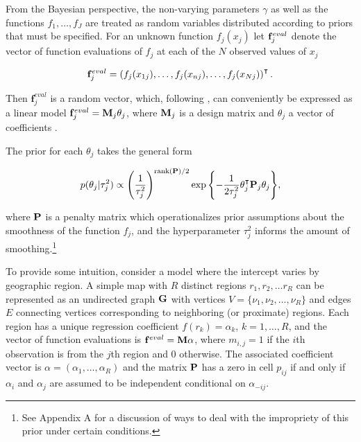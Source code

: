 From the Bayesian perspective, the non-varying parameters $\gamma$ as well as the 
functions $f_1, \dots, f_J$ are treated as random variables distributed according to priors that must 
be specified. For an unknown function $f_j(x_j)$ let $\mathbf{f}_j^{eval}$ denote the vector of function 
evaluations of $f_j$ at each of the $N$ observed values of $x_j$ 

\begin{equation*}
\mathbf{f}_j^{eval} = \left(f_j(x_{1j}), \dots, f_j(x_{nj}), \dots, f_j(x_{Nj})\right)^\intercal.  
 \end{equation*}
 
\noindent Then $\mathbf{f}_j^{eval}$ is a random vector, which, following 
, can conveniently be expressed as a linear model 
$\mathbf{f}_j^{eval} = \mathbf{M}_j \theta_j$, where $\mathbf{M}_j$ is a design matrix and 
$\theta_j$ a vector of coefficients . 

The prior for each $\theta_j$  takes the general form

\begin{equation*}
p(\theta_j | \tau^2_j) 
\propto 
\left(\frac{1}{\tau_j^2} \right)^{{\rm rank}(\mathbf{P})/2}
\exp{\left\{-\frac{1}{2\tau^2_j} \theta_j^\intercal \mathbf{P}_j \theta_j\right\}},
\end{equation*}

\noindent where $\mathbf{P}$ is a penalty matrix which operationalizes prior assumptions 
about the smoothness of the function $f_j$, and the hyperparameter $\tau^2_j$
informs the amount of smoothing.\footnote{See Appendix A %
for a discussion of ways to deal with the impropriety of this prior under certain conditions.}

To provide some intuition, consider a model where the intercept varies by geographic region. 
A simple map with $R$ distinct regions $r_1, r_2, \dots r_R$ can be represented as an undirected graph 
$\mathbf{G}$ with vertices $V = \{\nu_1, \nu_2, \dots, \nu_R\}$ and edges $E$ connecting vertices corresponding 
to neighboring (or proximate) regions. Each region has a unique regression coefficient $f(r_k) = \alpha_k$,
$k = 1, \dots, R$, and the vector of function evaluations is $\mathbf{f}^{eval} = \mathbf{M} \alpha$,
where $m_{i,j} = 1$ if the $i$th observation is from the $j$th region and 0 otherwise. The associated 
coefficient vector is $\alpha = (\alpha_1, \dots, \alpha_R)$ and the matrix $\mathbf{P}$ has a zero in  
cell $p_{ij}$ if and only if $\alpha_i$ and $\alpha_j$ are assumed to be independent conditional on 
$\alpha_{-ij}$. 

